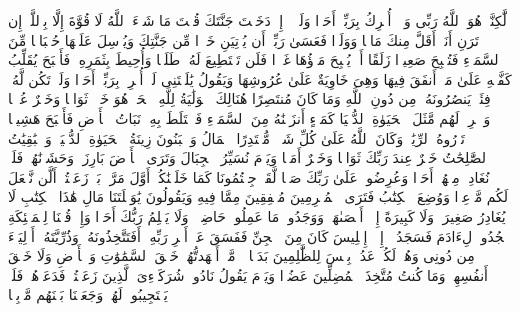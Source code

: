 \stopbuffer
\startbuffer[\q:18:38]
لَّٰكِنَّا۠ هُوَ ٱللَّهُ رَبِّی وَلَاۤ أُشۡرِكُ بِرَبِّیۤ أَحَدࣰا%
\stopbuffer
\startbuffer[\q:18:39]
وَلَوۡلَاۤ إِذۡ دَخَلۡتَ جَنَّتَكَ قُلۡتَ مَا شَاۤءَ ٱللَّهُ لَا قُوَّةَ إِلَّا بِٱللَّهِۚ إِن تَرَنِ أَنَا۠ أَقَلَّ مِنكَ مَالࣰا وَوَلَدࣰا%
\stopbuffer
\startbuffer[\q:18:40]
فَعَسَىٰ رَبِّیۤ أَن یُؤۡتِیَنِ خَیۡرࣰا مِّن جَنَّتِكَ وَیُرۡسِلَ عَلَیۡهَا حُسۡبَانࣰا مِّنَ ٱلسَّمَاۤءِ فَتُصۡبِحَ صَعِیدࣰا زَلَقًا%
\stopbuffer
\startbuffer[\q:18:41]
أَوۡ یُصۡبِحَ مَاۤؤُهَا غَوۡرࣰا فَلَن تَسۡتَطِیعَ لَهُۥ طَلَبࣰا%
\stopbuffer
\startbuffer[\q:18:42]
وَأُحِیطَ بِثَمَرِهِۦ فَأَصۡبَحَ یُقَلِّبُ كَفَّیۡهِ عَلَىٰ مَاۤ أَنفَقَ فِیهَا وَهِیَ خَاوِیَةٌ عَلَىٰ عُرُوشِهَا وَیَقُولُ یَٰلَیۡتَنِی لَمۡ أُشۡرِكۡ بِرَبِّیۤ أَحَدࣰا%
\stopbuffer
\startbuffer[\q:18:43]
وَلَمۡ تَكُن لَّهُۥ فِئَةࣱ یَنصُرُونَهُۥ مِن دُونِ ٱللَّهِ وَمَا كَانَ مُنتَصِرًا%
\stopbuffer
\startbuffer[\q:18:44]
هُنَالِكَ ٱلۡوَلَٰیَةُ لِلَّهِ ٱلۡحَقِّۚ هُوَ خَیۡرࣱ ثَوَابࣰا وَخَیۡرٌ عُقۡبࣰا%
\stopbuffer
\startbuffer[\q:18:45]
وَٱضۡرِبۡ لَهُم مَّثَلَ ٱلۡحَیَوٰةِ ٱلدُّنۡیَا كَمَاۤءٍ أَنزَلۡنَٰهُ مِنَ ٱلسَّمَاۤءِ فَٱخۡتَلَطَ بِهِۦ نَبَاتُ ٱلۡأَرۡضِ فَأَصۡبَحَ هَشِیمࣰا تَذۡرُوهُ ٱلرِّیَٰحُۗ وَكَانَ ٱللَّهُ عَلَىٰ كُلِّ شَیۡءࣲ مُّقۡتَدِرًا%
\stopbuffer
\startbuffer[\q:18:46]
ٱلۡمَالُ وَٱلۡبَنُونَ زِینَةُ ٱلۡحَیَوٰةِ ٱلدُّنۡیَاۖ وَٱلۡبَٰقِیَٰتُ ٱلصَّٰلِحَٰتُ خَیۡرٌ عِندَ رَبِّكَ ثَوَابࣰا وَخَیۡرٌ أَمَلࣰا%
\stopbuffer
\startbuffer[\q:18:47]
وَیَوۡمَ نُسَیِّرُ ٱلۡجِبَالَ وَتَرَى ٱلۡأَرۡضَ بَارِزَةࣰ وَحَشَرۡنَٰهُمۡ فَلَمۡ نُغَادِرۡ مِنۡهُمۡ أَحَدࣰا%
\stopbuffer
\startbuffer[\q:18:48]
وَعُرِضُوا۟ عَلَىٰ رَبِّكَ صَفࣰّا لَّقَدۡ جِئۡتُمُونَا كَمَا خَلَقۡنَٰكُمۡ أَوَّلَ مَرَّةِۭۚ بَلۡ زَعَمۡتُمۡ أَلَّن نَّجۡعَلَ لَكُم مَّوۡعِدࣰا%
\stopbuffer
\startbuffer[\q:18:49]
وَوُضِعَ ٱلۡكِتَٰبُ فَتَرَى ٱلۡمُجۡرِمِینَ مُشۡفِقِینَ مِمَّا فِیهِ وَیَقُولُونَ یَٰوَیۡلَتَنَا مَالِ هَٰذَا ٱلۡكِتَٰبِ لَا یُغَادِرُ صَغِیرَةࣰ وَلَا كَبِیرَةً إِلَّاۤ أَحۡصَىٰهَاۚ وَوَجَدُوا۟ مَا عَمِلُوا۟ حَاضِرࣰاۗ وَلَا یَظۡلِمُ رَبُّكَ أَحَدࣰا%
\stopbuffer
\startbuffer[\q:18:50]
وَإِذۡ قُلۡنَا لِلۡمَلَٰۤئِكَةِ ٱسۡجُدُوا۟ لِءَادَمَ فَسَجَدُوۤا۟ إِلَّاۤ إِبۡلِیسَ كَانَ مِنَ ٱلۡجِنِّ فَفَسَقَ عَنۡ أَمۡرِ رَبِّهِۦۤۗ أَفَتَتَّخِذُونَهُۥ وَذُرِّیَّتَهُۥۤ أَوۡلِیَاۤءَ مِن دُونِی وَهُمۡ لَكُمۡ عَدُوُّۢۚ بِئۡسَ لِلظَّٰلِمِینَ بَدَلࣰا%
\stopbuffer
\startbuffer[\q:18:51]
۞ مَّاۤ أَشۡهَدتُّهُمۡ خَلۡقَ ٱلسَّمَٰوَٰتِ وَٱلۡأَرۡضِ وَلَا خَلۡقَ أَنفُسِهِمۡ وَمَا كُنتُ مُتَّخِذَ ٱلۡمُضِلِّینَ عَضُدࣰا%
\stopbuffer
\startbuffer[\q:18:52]
وَیَوۡمَ یَقُولُ نَادُوا۟ شُرَكَاۤءِیَ ٱلَّذِینَ زَعَمۡتُمۡ فَدَعَوۡهُمۡ فَلَمۡ یَسۡتَجِیبُوا۟ لَهُمۡ وَجَعَلۡنَا بَیۡنَهُم مَّوۡبِقࣰا%
